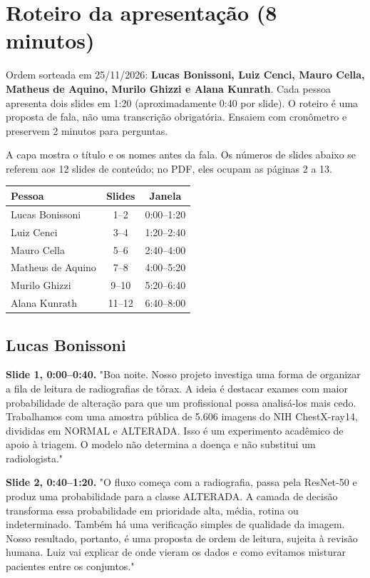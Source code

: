 \documentclass[11pt,a4paper]{article}
\begin{document}
\section*{Roteiro da apresentação (8 minutos)}

Ordem sorteada em 25/11/2026: \textbf{Lucas Bonissoni, Luiz Cenci, Mauro Cella, Matheus de Aquino, Murilo Ghizzi e Alana Kunrath}. Cada pessoa apresenta dois slides em 1:20 (aproximadamente 0:40 por slide). O roteiro é uma proposta de fala, não uma transcrição obrigatória. Ensaiem com cronômetro e preservem 2 minutos para perguntas.\par

A capa mostra o título e os nomes antes da fala. Os números de slides abaixo se referem aos 12 slides de conteúdo; no PDF, eles ocupam as páginas 2 a 13.\par

\begin{center}\renewcommand{\arraystretch}{1.2}\begin{tabular}{p{7cm}cc}\toprule
Pessoa & Slides & Janela \\
\midrule
Lucas Bonissoni & 1--2 & 0:00--1:20 \\
Luiz Cenci & 3--4 & 1:20--2:40 \\
Mauro Cella & 5--6 & 2:40--4:00 \\
Matheus de Aquino & 7--8 & 4:00--5:20 \\
Murilo Ghizzi & 9--10 & 5:20--6:40 \\
Alana Kunrath & 11--12 & 6:40--8:00 \\
\bottomrule\end{tabular}\end{center}

\subsection*{Lucas Bonissoni}

\textbf{Slide 1, 0:00--0:40.} "Boa noite. Nosso projeto investiga uma forma de organizar a fila de leitura de radiografias de tórax. A ideia é destacar exames com maior probabilidade de alteração para que um profissional possa analisá-los mais cedo. Trabalhamos com uma amostra pública de 5.606 imagens do NIH ChestX-ray14, divididas em NORMAL e ALTERADA. Isso é um experimento acadêmico de apoio à triagem. O modelo não determina a doença e não substitui um radiologista."\par

\textbf{Slide 2, 0:40--1:20.} "O fluxo começa com a radiografia, passa pela ResNet-50 e produz uma probabilidade para a classe ALTERADA. A camada de decisão transforma essa probabilidade em prioridade alta, média, rotina ou indeterminado. Também há uma verificação simples de qualidade da imagem. Nosso resultado, portanto, é uma proposta de ordem de leitura, sujeita à revisão humana. Luiz vai explicar de onde vieram os dados e como evitamos misturar pacientes entre os conjuntos."\par
\end{document}
